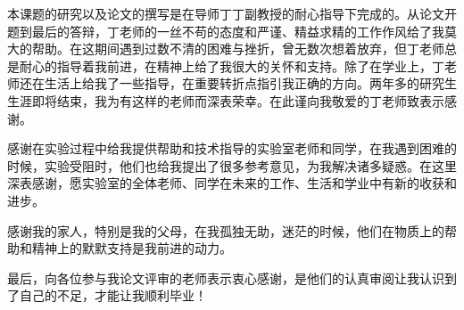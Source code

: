 \begin{thanks}
    本课题的研究以及论文的撰写是在导师丁丁副教授的耐心指导下完成的。从论文开题到最后的答辩，丁老师的一丝不苟的态度和严谨、精益求精的工作作风给了我莫大的帮助。在这期间遇到过数不清的困难与挫折，曾无数次想着放弃，但丁老师总是耐心的指导着我前进，在精神上给了我很大的关怀和支持。除了在学业上，丁老师还在生活上给我了一些指导，在重要转折点指引我正确的方向。两年多的研究生生涯即将结束，我为有这样的老师而深表荣幸。在此谨向我敬爱的丁老师致表示感谢。
    
    感谢在实验过程中给我提供帮助和技术指导的实验室老师和同学，在我遇到困难的时候，实验受阻时，他们也给我提出了很多参考意见，为我解决诸多疑惑。在这里深表感谢，愿实验室的全体老师、同学在未来的工作、生活和学业中有新的收获和进步。
    
    感谢我的家人，特别是我的父母，在我孤独无助，迷茫的时候，他们在物质上的帮助和精神上的默默支持是我前进的动力。
    
    最后，向各位参与我论文评审的老师表示衷心感谢，是他们的认真审阅让我认识到了自己的不足，才能让我顺利毕业！
    
\end{thanks}